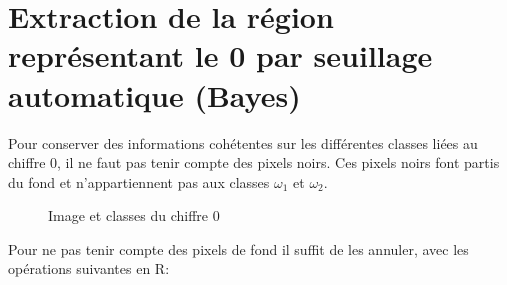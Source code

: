 \documentclass[a4paper,11pt]{article}
\begin{document}
  \section{Extraction de la région représentant le 0 par seuillage automatique (Bayes)}
  
  Pour conserver des informations cohétentes sur les différentes classes liées au chiffre 0,
  il ne faut pas tenir compte des pixels noirs. Ces pixels noirs font partis du fond et 
  n'appartiennent pas aux classes $\omega_1$ et $\omega_2$.
  
  \begin{figure}[H]
    \center
    \caption{Image et classes du chiffre 0}
  \end{figure}
  
  Pour ne pas tenir compte des pixels de fond il suffit de les annuler, avec les 
  opérations suivantes en R:
  
\end{document}
